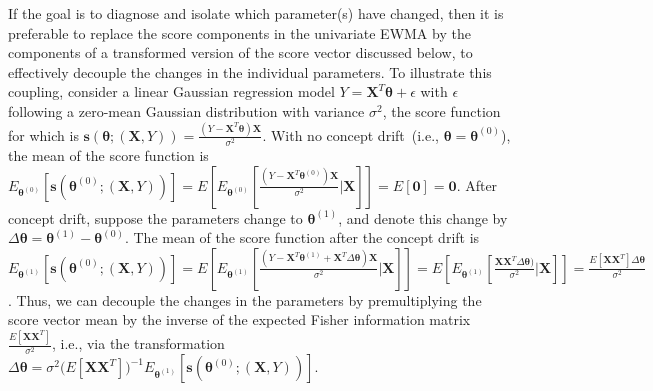 \documentclass[twoside,11pt]{article}
\begin{document}
If the goal is to diagnose and isolate which parameter(s) have changed, then it is preferable to replace the score components in the univariate EWMA by the components of a transformed version of the score vector discussed below, to effectively decouple the changes in the individual parameters. To illustrate this coupling, consider a linear Gaussian regression model $Y = \bm{X}^T\bm{\theta} + \epsilon$ with $\epsilon$ following a zero-mean Gaussian distribution with variance $\sigma^2$, the score function for which is $\bm{s}(\bm { \theta}; (\bm {X}, Y)) = \frac{(Y - \bm{X}^T\bm{\theta})\bm{X}}{\sigma^2}$. With no concept drift~(i.e., $\bm { \theta} = \bm { \theta}^{ (0)}$), the mean of the score function is $E_{\bm{ \theta}^{ (0)}}[\bm{s}(\bm { \theta}^{ (0)}; (\bm {X}, Y))] = E[E_{\bm{ \theta}^{ (0)}}[ \frac{(Y - \bm{X}^T\bm{\theta}^{ (0)})\bm{X}}{\sigma^2}|\bm {X}]] =  E[\bm{0}] = \bm{0}$. After concept drift, suppose the parameters change to $\bm { \theta} ^{ (1)}$, and denote this change by $ \Delta \bm { \theta} = \bm { \theta} ^{ (1)} - \bm { \theta}^ { (0)}$. The mean of the score function after the concept drift is $E_{\bm{ \theta}^{ (1)}}[\bm{s}(\bm { \theta}^{ (0)}; (\bm {X}, Y))]=E[E_{\bm{ \theta}^{ (1)}}[\frac{(Y - \bm {X}^T\bm { \theta}^{ (1)} + \bm {X}^T\Delta \bm { \theta}) \bm {X}}{\sigma^2} |\bm {X}]] = E[E_{\bm{ \theta}^{ (1)}}[\frac{\bm {X}\bm {X}^T\Delta \bm { \theta})}{\sigma^2} |\bm {X}]] = \frac{E [\bm {X}\bm {X}^T] \Delta \bm { \theta}}{\sigma^2}$. Thus, we can decouple the changes in the parameters by premultiplying the score vector mean by the inverse of the expected Fisher information matrix $\frac{E [\bm {X}\bm {X}^T]}{\sigma^2}$, i.e., via the transformation $ \Delta \bm { \theta} = \sigma^2 \big(E [\bm {X}\bm {X}^T]\big)^{-1} E_{\bm{ \theta}^{ (1)}}[\bm{s}(\bm { \theta}^{ (0)}; (\bm {X}, Y))]$. 
\end{document}
